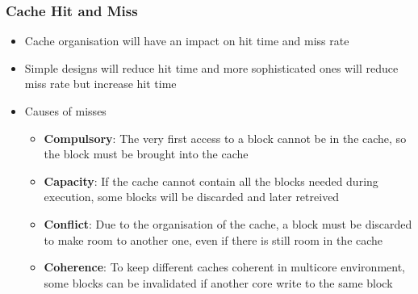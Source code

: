 \documentclass{beamer}
\begin{document}
\begin{frame}[fragile]
\frametitle{Cache Hit and Miss}

\begin{itemize}

\item Cache organisation will have an impact on hit time and
  miss rate

\vspace{0.25cm}

\item Simple designs will reduce hit time and more sophisticated ones will reduce miss rate
  but increase hit time

\vspace{0.25cm}

\item Causes of misses
  \begin{itemize}
    \scriptsize
  \item \textbf{Compulsory}: The very first access to a block cannot be in the cache, so the
    block must be brought into the cache
    \vspace{0.1cm}
  \item \textbf{Capacity}: If the cache cannot contain all the blocks needed during execution,
    some blocks will be discarded and later retreived
        \vspace{0.1cm}
\item \textbf{Conflict}: Due to the organisation of the cache, a block must be discarded to make
  room to another one, even if there is still room in the cache
      \vspace{0.1cm}
\item \textbf{Coherence}: To keep different caches coherent in multicore environment, some blocks can
  be invalidated if another core write to the same block
  \end{itemize}

\end{itemize}

\end{frame}
\end{document}
